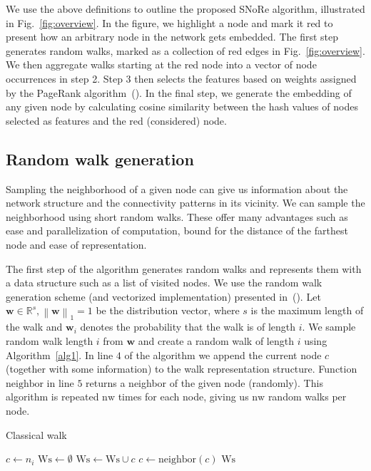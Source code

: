 \documentclass[twoside,11pt]{article}
\begin{document}
We use the above definitions to outline the proposed SNoRe algorithm, illustrated in Fig.~\ref{fig:overview}. In the figure, we highlight a node and mark it red to present how an arbitrary node in the network gets embedded. The first step generates random walks, marked as a collection of red edges in Fig.~\ref{fig:overview}. We then aggregate walks starting at the red node into a vector of node occurrences in step 2. Step 3 then selects the features based on weights assigned by the PageRank algorithm~(\cite{ilprints422}). In the final step, we generate the embedding of any given node by calculating cosine similarity between the hash values of nodes selected as features and the red (considered) node.

\subsection{Random walk generation}
\label{sec:randomgen}
Sampling the neighborhood of a given node can give us information about the network structure and the connectivity patterns in its vicinity. We can sample the neighborhood using short random walks. These offer many advantages such as ease and parallelization of computation, bound for the distance of the farthest node and ease of representation.

The first step of the algorithm generates random walks and represents them with a data structure such as a list of visited nodes. We use the random walk generation scheme (and vectorized implementation) presented in~(\cite{skrlj2019sge}). Let $\boldsymbol{w} \in \mathbb{R}^s, \left\lVert \boldsymbol{w} \right\rVert_1 = 1$ be the distribution vector, where $s$ is the maximum length of the walk and $\boldsymbol{w}_i$ denotes the probability that the walk is of length $i$. We sample random walk length $i$ from $\boldsymbol{w}$ and create a random walk of length $i$ using Algorithm~\ref{alg1}. In line $4$ of the algorithm we append the current node $c$ (together with some information) to the walk representation structure. Function $\textrm{neighbor}$ in line $5$ returns a neighbor of the given node (randomly). This algorithm is repeated $\textrm{nw}$ times for each node, giving us $\textrm{nw}$ random walks per node.

\begin{algorithm}[h]
\caption{Classical walk}
\label{alg1}
\begin{algorithmic}[1]
    \STATE $c \gets n_i$
    \STATE $\textrm{Ws} \gets \emptyset$
        \STATE $\textrm{Ws} \gets \textrm{Ws} \cup c$
        \STATE $c \gets \textrm{neighbor}(c)$
    \ENDFOR
    \RETURN $\textrm{Ws}$\;
\end{algorithmic}
\end{algorithm}
\end{document}
